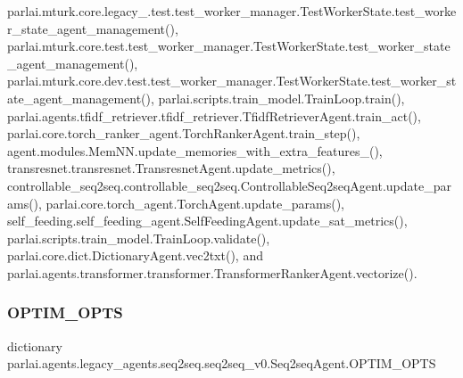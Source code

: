 parlai.\+mturk.\+core.\+legacy\+\_.\+test.\+test\+\_\+worker\+\_\+manager.\+Test\+Worker\+State.\+test\+\_\+worker\+\_\+state\+\_\+agent\+\_\+management(), parlai.\+mturk.\+core.\+test.\+test\+\_\+worker\+\_\+manager.\+Test\+Worker\+State.\+test\+\_\+worker\+\_\+state\+\_\+agent\+\_\+management(), parlai.\+mturk.\+core.\+dev.\+test.\+test\+\_\+worker\+\_\+manager.\+Test\+Worker\+State.\+test\+\_\+worker\+\_\+state\+\_\+agent\+\_\+management(), parlai.\+scripts.\+train\+\_\+model.\+Train\+Loop.\+train(), parlai.\+agents.\+tfidf\+\_\+retriever.\+tfidf\+\_\+retriever.\+Tfidf\+Retriever\+Agent.\+train\+\_\+act(), parlai.\+core.\+torch\+\_\+ranker\+\_\+agent.\+Torch\+Ranker\+Agent.\+train\+\_\+step(), agent.\+modules.\+Mem\+N\+N.\+update\+\_\+memories\+\_\+with\+\_\+extra\+\_\+features\+\_\+(), transresnet.\+transresnet.\+Transresnet\+Agent.\+update\+\_\+metrics(), controllable\+\_\+seq2seq.\+controllable\+\_\+seq2seq.\+Controllable\+Seq2seq\+Agent.\+update\+\_\+params(), parlai.\+core.\+torch\+\_\+agent.\+Torch\+Agent.\+update\+\_\+params(), self\+\_\+feeding.\+self\+\_\+feeding\+\_\+agent.\+Self\+Feeding\+Agent.\+update\+\_\+sat\+\_\+metrics(), parlai.\+scripts.\+train\+\_\+model.\+Train\+Loop.\+validate(), parlai.\+core.\+dict.\+Dictionary\+Agent.\+vec2txt(), and parlai.\+agents.\+transformer.\+transformer.\+Transformer\+Ranker\+Agent.\+vectorize().

\mbox{\label{classparlai_1_1agents_1_1legacy__agents_1_1seq2seq_1_1seq2seq__v0_1_1Seq2seqAgent_a83374019847ffa0c1cc43bf0b24120e9}} 
\subsubsection{\texorpdfstring{O\+P\+T\+I\+M\+\_\+\+O\+P\+TS}{OPTIM\_OPTS}}
{\footnotesize\ttfamily dictionary parlai.\+agents.\+legacy\+\_\+agents.\+seq2seq.\+seq2seq\+\_\+v0.\+Seq2seq\+Agent.\+O\+P\+T\+I\+M\+\_\+\+O\+P\+TS\hspace{0.3cm}{\ttfamily [static]}}

